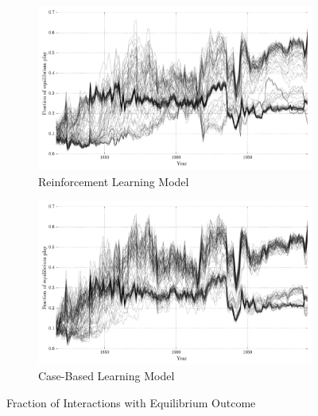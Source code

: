 \begin{figure}[h!]
    \centering

    \begin{subfigure}[t]{\textwidth}
        \includegraphics[width=\textwidth]{WarReason/Figures/RL_equilibria}
        \caption{Reinforcement Learning Model}
    \end{subfigure}
    
    \begin{subfigure}[t]{\textwidth}
        \includegraphics[width=\textwidth]{WarReason/Figures/CB_equilibria}
        \caption{Case-Based Learning Model}
    \end{subfigure}

    \caption{Fraction of Interactions with Equilibrium Outcome}
    \label{fig:ex2_traces}
    \figSpace
\end{figure}

